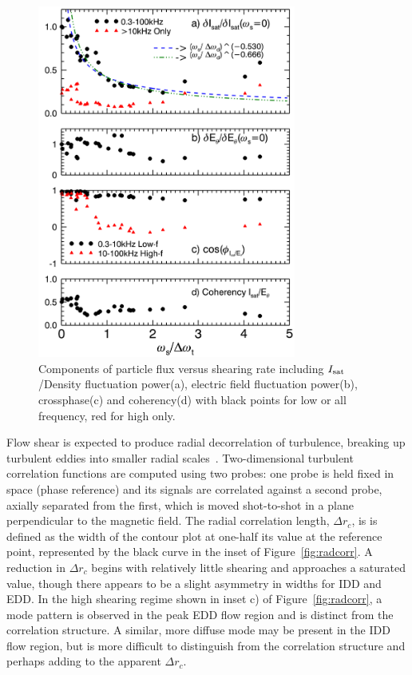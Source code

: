 \documentclass[aps,prl,amsmath,amssymb,preprint,superscriptaddress]{revtex4}
\begin{document}
\begin{figure}[!htbp]
\centerline{
\includegraphics[width=8.5cm]{fluxcomps.pdf}}
\caption{\label{fig:fluxcomps} Components of particle flux versus shearing rate including $I_{\rm sat}$/Density fluctuation power(a), electric field fluctuation power(b), crossphase(c) and coherency(d) with black points for low or all frequency, red for high only.}
\end{figure}

Flow shear is expected to produce radial decorrelation of turbulence,
breaking up turbulent eddies into smaller radial scales~\cite{biglari90}.
Two-dimensional turbulent correlation functions are computed using
two probes: one probe is held fixed in space (phase reference) and
its signals are correlated against a second probe, axially separated
from the first, which is moved shot-to-shot in a plane perpendicular
to the magnetic field.  The radial correlation length, $\Delta r_c$, is is defined as the width of the contour plot at one-half its value at the reference point, represented by the black curve in the inset of Figure~\ref{fig:radcorr}. A reduction in $\Delta r_{c}$ begins with relatively little shearing and approaches a saturated value, though there appears to be a slight asymmetry in widths for IDD and EDD. In the high shearing regime shown in inset c) of Figure~\ref{fig:radcorr}, a mode pattern is observed in the peak EDD flow region and is distinct from the correlation structure. A similar, more diffuse mode may be present in the IDD flow region, but is more difficult to distinguish from the correlation structure and perhaps adding to the apparent $\Delta r_{c}$.
\end{document}
